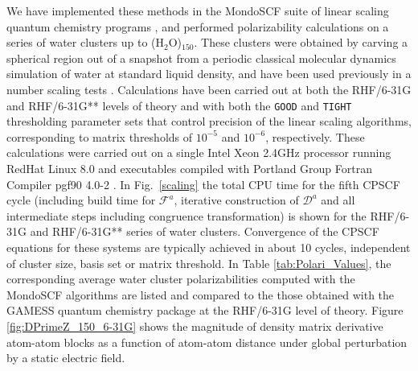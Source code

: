 \documentclass[prl,aps,twocolumn,showpacs,twocolumngrid,superbib]{revtex4}
\begin{document}
We have implemented these methods in the {\sc MondoSCF} suite of linear scaling quantum chemistry programs \cite{MondoSCF},
and performed polarizability calculations on a series of water clusters up to (H$_2$O)$_{150}$.  These clusters were
obtained by carving a spherical region out of a snapshot from a periodic classical  molecular dynamics simulation of water 
at standard liquid density, and have been used previously in a number scaling tests \cite{ESchwegler97,ANiklasson03,MChallacombe97}.
Calculations have been carried out at both the RHF/6-31G and RHF/6-31G** levels of 
theory and with both the {\tt GOOD} and {\tt TIGHT} thresholding parameter sets that control precision of the 
linear scaling algorithms, corresponding to matrix thresholds of $10^{-5}$ and $10^{-6}$, respectively.  
These calculations were carried out on a single Intel Xeon 2.4GHz processor running RedHat Linux 8.0 and  executables compiled 
with Portland Group Fortran Compiler pgf90 4.0-2 \cite{PGF90}. In Fig.~\ref{scaling} the 
total CPU time for the fifth CPSCF cycle (including build time for $\mathcal{F}^a$, 
iterative construction of $\mathcal{D}^a$ and all intermediate 
steps including congruence transformation) is shown for the RHF/6-31G and RHF/6-31G** series 
of water clusters.  Convergence of the CPSCF equations for these systems are typically 
achieved in about 10 cycles, independent of cluster size, basis set or matrix threshold.  
In Table \ref{tab:Polari_Values},  the corresponding average water cluster polarizabilities computed with the  {\sc MondoSCF}
algorithms are listed and compared to the those obtained with the {\sc GAMESS} quantum chemistry package \cite{gamess} 
at the RHF/6-31G level of theory.  Figure \ref{fig:DPrimeZ_150_6-31G} shows the magnitude of density matrix 
derivative atom-atom blocks as a function of atom-atom distance under global perturbation by a static electric field.
\end{document}
